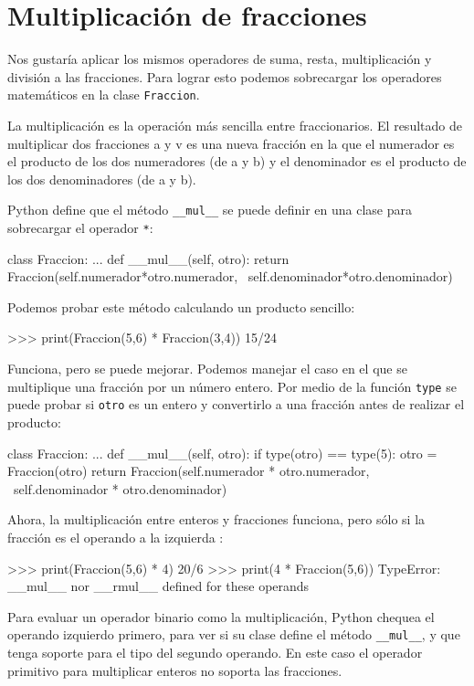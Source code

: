 \section{Multiplicación de fracciones}

 

Nos gustaría aplicar los mismos operadores de suma, resta, multiplicación
y división a las fracciones. Para lograr esto podemos sobrecargar
los operadores matemáticos en la clase \texttt{Fraccion}.

  

La multiplicación es la operación más sencilla entre fraccionarios.
El resultado de multiplicar dos fracciones a y v es una nueva fracción
en la que el numerador es el producto de los dos numeradores (de a
y b) y el denominador es el producto de los dos denominadores (de
a y b).

Python define que el método \texttt{\_\_mul\_\_} se puede definir
en una clase para sobrecargar el operador \texttt{{*}}:
\begin{pythoncode}
class Fraccion:
  ...
  def __mul__(self, otro):
    return Fraccion(self.numerador*otro.numerador, \
                    self.denominador*otro.denominador)
\end{pythoncode}

Podemos probar este método calculando un producto sencillo:
\begin{pyconcode}
>>> print(Fraccion(5,6) * Fraccion(3,4))
15/24
\end{pyconcode}

Funciona, pero se puede mejorar. Podemos manejar el caso en el que
se multiplique una fracción por un número entero. Por medio de la
función \texttt{type} se puede probar si \texttt{otro} es un entero
y convertirlo a una fracción antes de realizar el producto:
\begin{pythoncode}
class Fraccion:
  ...
  def __mul__(self, otro):
    if type(otro) == type(5):
      otro = Fraccion(otro)
    return Fraccion(self.numerador   * otro.numerador, \
                    self.denominador * otro.denominador)
\end{pythoncode}

Ahora, la multiplicación entre enteros y fracciones funciona, pero
sólo si la fracción es el operando a la izquierda :

\begin{pyconcode}
>>> print(Fraccion(5,6) * 4)
20/6
>>> print(4 * Fraccion(5,6))
TypeError: __mul__ nor __rmul__ defined for these operands
\end{pyconcode}
 Para evaluar un operador binario como la multiplicación, Python chequea
el operando izquierdo primero, para ver si su clase define el método
\texttt{\_\_mul\_\_}, y que tenga soporte para el tipo del segundo
operando. En este caso el operador primitivo para multiplicar enteros
no soporta las fracciones.

